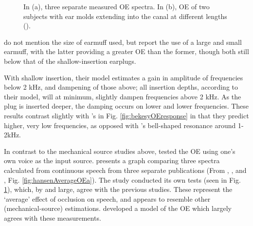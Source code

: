 \documentclass[dissertation,copyright]{uathesis}
\begin{document}
\begin{figure}
\begin{subfigure}{0.5\textwidth}
\begin{subfigure}{0.8\textwidth}
  \end{subfigure}
  \caption{ }
  \label{fig:hansenAverageOEb}
\end{subfigure}
\caption{In (a), three separate measured OE spectra. In (b), OE of two subjects with ear molds extending into the canal at different lengths (\cite{hansen:97b}).}
\label{fig:hansenAverageOE}
\end{figure}
%
\cite{dean:00} do not mention the size of earmuff used, but \cite{stenfelt:07} report the use of a large and small earmuff, with the latter providing a greater OE than the former, though both still below that of the shallow-insertion earplugs.

With shallow insertion, their model estimates a gain in amplitude of frequencies below 2 kHz, and dampening of those above; all insertion depths, according to their model, will at minimum, slightly dampen frequencies above 2 kHz.  As the plug is inserted deeper, the damping occurs on lower and lower frequencies. These results contrast slightly with \cite{bekesy:60}'s in Fig. \ref{fig:bekesyOEresponse} in that they predict higher, very low frequencies, as opposed with \cite{bekesy:60}'s bell-shaped resonance around 1-2kHz.


In contrast to the mechanical source studies above, \cite{hansen:97b} tested the OE using one's own voice as the input source.  \cite{hansen:97b} presents a graph comparing three spectra calculated from continuous speech from three separate publications (From \cite{wimmer:86}, \cite{thorup:96}, and \cite{may:92}, Fig. \ref{fig:hansenAverageOEa}).  The study conducted its own tests (seen in Fig. \ref{fig:hansenAverageOEb}), which, by and large, agree with the previous studies.  
These represent the `average' effect of occlusion on speech, and appears to resemble other (mechanical-source) estimations.  \cite{hansen:97b} developed a model of the OE which largely agrees with these measurements.
\end{document}
